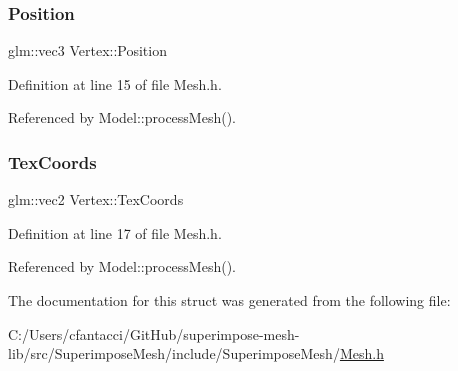 \subsubsection{\texorpdfstring{Position}{Position}}
{\footnotesize\ttfamily glm\+::vec3 Vertex\+::\+Position}



Definition at line 15 of file Mesh.\+h.



Referenced by Model\+::process\+Mesh().

\mbox{\label{structVertex_a921a513c1e6d1e63e99d477fa837a317}} 
\subsubsection{\texorpdfstring{Tex\+Coords}{TexCoords}}
{\footnotesize\ttfamily glm\+::vec2 Vertex\+::\+Tex\+Coords}



Definition at line 17 of file Mesh.\+h.



Referenced by Model\+::process\+Mesh().



The documentation for this struct was generated from the following file\+:\begin{DoxyCompactItemize}
\item 
C\+:/\+Users/cfantacci/\+Git\+Hub/superimpose-\/mesh-\/lib/src/\+Superimpose\+Mesh/include/\+Superimpose\+Mesh/\mbox{\hyperlink{Mesh_8h}{Mesh.\+h}}\end{DoxyCompactItemize}
